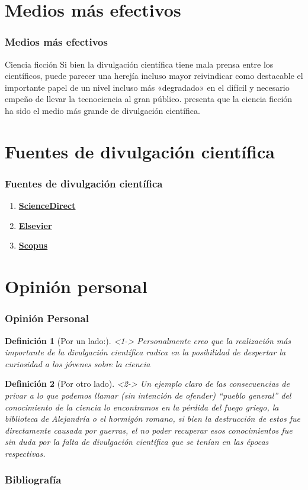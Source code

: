 \documentclass{beamer}
\newtheorem{definicion}{Definición}
\begin{document}
	\section{Medios más efectivos}
	\begin{frame}
		\frametitle{Medios más efectivos}
		\begin{block}{Ciencia ficción}
			Si bien la divulgación científica tiene mala prensa entre los científicos, puede parecer una herejía incluso mayor reivindicar como destacable el importante papel de un nivel incluso más «degradado» en el difícil y necesario empeño de llevar la tecnociencia al gran público. \cite{barcelo_ciencia_1998} presenta que la ciencia ficción ha sido el medio más grande de divulgación científica.
		\end{block}
	\end{frame}

	\section{Fuentes de divulgación científica}
	\begin{frame}
		
		\frametitle{Fuentes de divulgación científica}
		\begin{enumerate}
			\item \href{https://www.sciencedirect.com/}{\textbf{ScienceDirect}} 
			\item \href{https://www.elsevier.es/es}{\textbf{Elsevier}}
			\item \href{https://www.scopus.com/home.uri}{\textbf{Scopus}}
		\end{enumerate}
		
	\end{frame}
	
	\section{Opinión personal}
	\begin{frame}
		\frametitle{Opinión Personal}
		 \begin{definicion}[Por un lado:]<1->
		 	Personalmente creo que la realización más importante de la divulgación científica radica en la posibilidad de despertar la curiosidad a los jóvenes sobre la ciencia
		 \end{definicion}
	 	\begin{definicion}[Por otro lado]<2->
	 		Un ejemplo claro de las consecuencias de privar a lo que podemos llamar (sin intención de ofender) “pueblo general” del conocimiento de la ciencia lo encontramos en la pérdida del fuego griego, la biblioteca de Alejandría o el hormigón romano, si bien la destrucción de estos fue directamente causada por guerras, el no poder recuperar esos conocimientos fue sin duda por la falta de divulgación científica que se tenían en las épocas respectivas.
	 		
	 	\end{definicion}
		  
		 
	\end{frame}
	
	\begin{frame}[allowframebreaks]
		\frametitle{Bibliografía}
		 \setcitestyle{notesep={; },round,aysep={,},yysep={;}}
		
		
	\end{frame}

	
\end{document}
